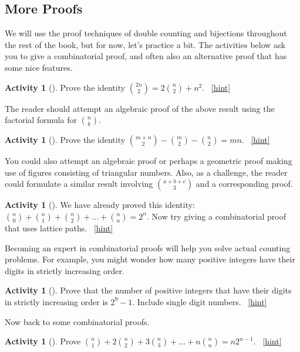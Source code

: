 \documentclass[10pt,]{book}
\theoremstyle{plain}
\theoremstyle{definition}
\theoremstyle{definition}
\theoremstyle{definition}
\newtheorem{activity}[project]{Activity}
\numberwithin{equation}{chapter}
\begin{document}
\subsection[{More Proofs}]{More Proofs}\label{subsec-moreproofs}
\hypertarget{p-232}{}%
We will use the proof techniques of double counting and bijections throughout the rest of the book, but for now, let's practice a bit.  The activities below ask you to give a combinatorial proof, and often also an alternative proof that has some nice features.%
\begin{activity}[]\label{act-redgreenballs}
\hypertarget{p-233}{}%
Prove the identity \(\binom{2n}{2} = 2 \binom{n}{2} + n^{2}\).%
~\hfill{\tiny\hyperlink{a-32}{[hint]}\hypertarget{q-32}{}}\end{activity}
\hypertarget{p-237}{}%
The reader should attempt an algebraic proof of the above result using the factorial formula for \(\binom{n}{k}\).%
\begin{activity}[]\label{act-bowtiefez}
\hypertarget{p-238}{}%
Prove the identity \(\binom{m + n}{2} - \binom{m}{2} - \binom{n}{2} = mn\).%
~\hfill{\tiny\hyperlink{a-33}{[hint]}\hypertarget{q-33}{}}\end{activity}
\hypertarget{p-241}{}%
You could also attempt an algebraic proof or perhaps a geometric proof making use of figures consisting of triangular numbers. Also, as a challenge, the reader could formulate a similar result involving \(\binom{a + b + c}{3}\) and a corresponding proof.%
\begin{activity}[]\label{activity-34}
\hypertarget{p-242}{}%
We have already proved this identity: \(\binom{n}{0} + \binom{n}{1} + \binom{n}{2} + \ldots + \binom{n}{n} = 2^{n}\).  Now try giving a combinatorial proof that uses lattice paths.%
~\hfill{\tiny\hyperlink{a-34}{[hint]}\hypertarget{q-34}{}}\end{activity}
\hypertarget{p-245}{}%
Becoming an expert in combinatorial proofs will help you solve actual counting problems.  For example, you might wonder how many positive integers have their digits in strictly increasing order.%
\begin{activity}[]\label{activity-35}
\hypertarget{p-246}{}%
Prove that the number of positive integers that have their digits in strictly increasing order is \(2^{9} - 1\). Include single digit numbers.%
~\hfill{\tiny\hyperlink{a-35}{[hint]}\hypertarget{q-35}{}}\end{activity}
\hypertarget{p-250}{}%
Now back to some combinatorial proofs.%
\begin{activity}[]\label{act_anysizecommittee}
\hypertarget{p-251}{}%
Prove \(\binom{n}{1} + 2 \binom{n}{2} + 3 \binom{n}{3} + \ldots + n \binom{n}{n} = n2^{n - 1}\).%
~\hfill{\tiny\hyperlink{a-36}{[hint]}\hypertarget{q-36}{}}\end{activity}
\end{document}
